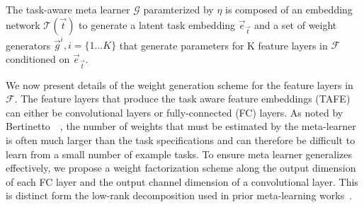 \documentclass[10pt,twocolumn,letterpaper]{article}
\newcommand{\joey}[1]{\textcolor{blue}{[Joey: #1]}}
\begin{document}
The task-aware meta learner $\mathcal{G}$ paramterized by $\eta$ is composed of an embedding network 
$\mathcal{T}(\Vec{t})$ to generate a latent task embedding $\Vec{e}_\Vec{t}$ and a set of
weight generators $\Vec{g}^i, i=\{1...K\}$ that generate parameters for K feature
layers in $\mathcal{F}$ conditioned on $\Vec{e}_\Vec{t}$. 

We now present details of the weight generation scheme for the feature layers in 
$\mathcal{F}$. 
The feature layers that produce the task aware feature embeddings (TAFE) can either be convolutional layers or fully-connected (FC) layers. 
As noted by Bertinetto~\etal~\cite{bertinetto2016learning}, the 
number of weights that must be estimated by the meta-learner is often much larger than the task specifications and can therefore be difficult to learn from a small number of example tasks.
To ensure meta learner generalizes effectively, we propose a weight 
factorization scheme along the output dimension of each FC layer and 
the output channel dimension of a convolutional layer.
This is distinct form the low-rank decomposition used in prior meta-learning works~\cite{bertinetto2016learning}. 
\end{document}
